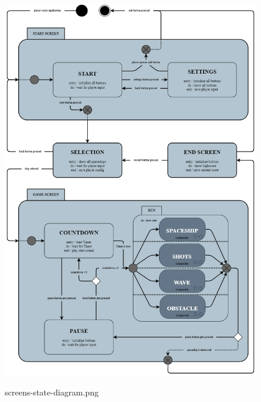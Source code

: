 \documentclass[10pt]{article}
\begin{document}
\begin{figure}
	\centering
	\includegraphics[width=1\textwidth]{../../../images/Pflichtenheft_Assets/uml-state-diagram/screens-state-diagram.png}\\
	\caption{screens-state-diagram.png}
\end{figure}

\newpage
\end{document}
